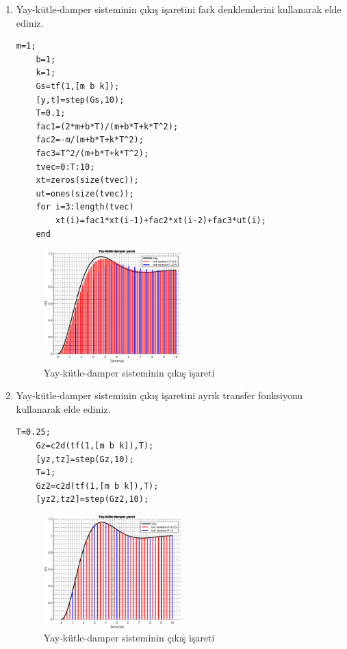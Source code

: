 \begin{enumerate}
    \item Yay-kütle-damper sisteminin çıkış işaretini fark denklemlerini kullanarak elde ediniz. 
    \begin{lstlisting}[style=Matlab-editor]
    m=1;
    b=1;
    k=1;
    Gs=tf(1,[m b k]);
    [y,t]=step(Gs,10);
    T=0.1;
    fac1=(2*m+b*T)/(m+b*T+k*T^2);
    fac2=-m/(m+b*T+k*T^2);
    fac3=T^2/(m+b*T+k*T^2);
    tvec=0:T:10;
    xt=zeros(size(tvec));
    ut=ones(size(tvec));
    for i=3:length(tvec)
        xt(i)=fac1*xt(i-1)+fac2*xt(i-2)+fac3*ut(i);
    end
    \end{lstlisting}

    \begin{figure}[!htb]
        \centering
        \includegraphics[width=0.5\textwidth]{img/lec3_step1}
        \caption{Yay-kütle-damper sisteminin çıkış işareti}
        \label{fig:lec3_step1}
    \end{figure}
    \item Yay-kütle-damper sisteminin çıkış işaretini ayrık transfer fonksiyonu kullanarak elde ediniz. 
    \begin{lstlisting}[style=Matlab-editor]
    T=0.25;
    Gz=c2d(tf(1,[m b k]),T);
    [yz,tz]=step(Gz,10);
    T=1;
    Gz2=c2d(tf(1,[m b k]),T);
    [yz2,tz2]=step(Gz2,10);
    \end{lstlisting}
    \begin{figure}[!htb]
        \centering
        \includegraphics[width=0.5\textwidth]{img/lec3_step2}
        \caption{Yay-kütle-damper sisteminin çıkış işareti}
        \label{fig:lec3_step2}
    \end{figure}
\end{enumerate}